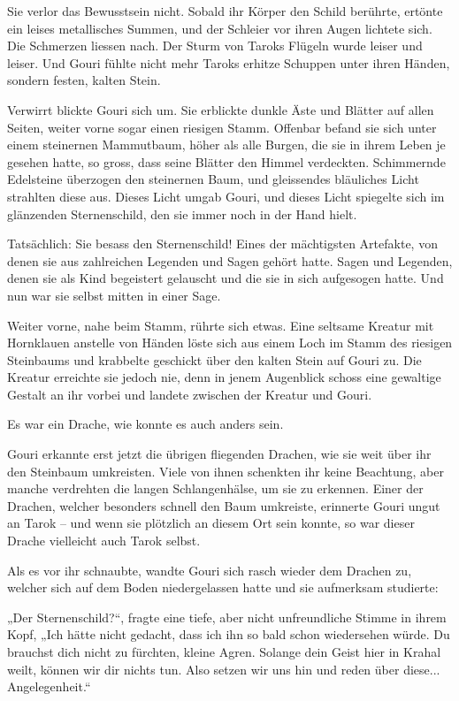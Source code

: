 \documentclass[10pt, a4paper, oneside]{book}
\begin{document}
Sie verlor das Bewusstsein nicht. Sobald ihr Körper den Schild berührte, ertönte ein leises metallisches Summen, und der Schleier vor ihren Augen lichtete sich. Die Schmerzen liessen nach. Der Sturm von Taroks Flügeln wurde leiser und leiser. Und Gouri fühlte nicht mehr Taroks erhitze Schuppen unter ihren Händen, sondern festen, kalten Stein.

Verwirrt blickte Gouri sich um. Sie erblickte dunkle Äste und Blätter auf allen Seiten, weiter vorne sogar einen riesigen Stamm. Offenbar befand sie sich unter einem steinernen Mammutbaum, höher als alle Burgen, die sie in ihrem Leben je gesehen hatte, so gross, dass seine Blätter den Himmel verdeckten. Schimmernde Edelsteine überzogen den steinernen Baum, und gleissendes bläuliches Licht strahlten diese aus. Dieses Licht umgab Gouri, und dieses Licht spiegelte sich im glänzenden Sternenschild, den sie immer noch in der Hand hielt.

Tatsächlich: Sie besass den Sternenschild! Eines der mächtigsten Artefakte, von denen sie aus zahlreichen Legenden und Sagen gehört hatte. Sagen und Legenden, denen sie als Kind begeistert gelauscht und die sie in sich aufgesogen hatte. Und nun war sie selbst mitten in einer Sage.

Weiter vorne, nahe beim Stamm, rührte sich etwas. Eine seltsame Kreatur mit Hornklauen anstelle von Händen löste sich aus einem Loch im Stamm des riesigen Steinbaums und krabbelte geschickt über den kalten Stein auf Gouri zu. Die Kreatur erreichte sie jedoch nie, denn in jenem Augenblick schoss eine gewaltige Gestalt an ihr vorbei und landete zwischen der Kreatur und Gouri.

Es war ein Drache, wie konnte es auch anders sein.

Gouri erkannte erst jetzt die übrigen fliegenden Drachen, wie sie weit über ihr den Steinbaum umkreisten. Viele von ihnen schenkten ihr keine Beachtung, aber manche verdrehten die langen Schlangenhälse, um sie zu erkennen. Einer der Drachen, welcher besonders schnell den Baum umkreiste, erinnerte Gouri ungut an Tarok – und wenn sie plötzlich an diesem Ort sein konnte, so war dieser Drache vielleicht auch Tarok selbst.

Als es vor ihr schnaubte, wandte Gouri sich rasch wieder dem Drachen zu, welcher sich auf dem Boden niedergelassen hatte und sie aufmerksam studierte:

„Der Sternenschild?“, fragte eine tiefe, aber nicht unfreundliche Stimme in ihrem Kopf, „Ich hätte nicht gedacht, dass ich ihn so bald schon wiedersehen würde. Du brauchst dich nicht zu fürchten, kleine Agren. Solange dein Geist hier in Krahal weilt, können wir dir nichts tun. Also setzen wir uns hin und reden über diese... Angelegenheit.“
\end{document}
